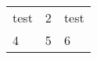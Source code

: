 \documentclass{article}
\begin{document}
\begin{tabular}{ p{30pt} | m{5pt} | b{5pt} }
test & 2 & test \\
4 & 5 & 6 \\
\end{tabular}
\end{document}
